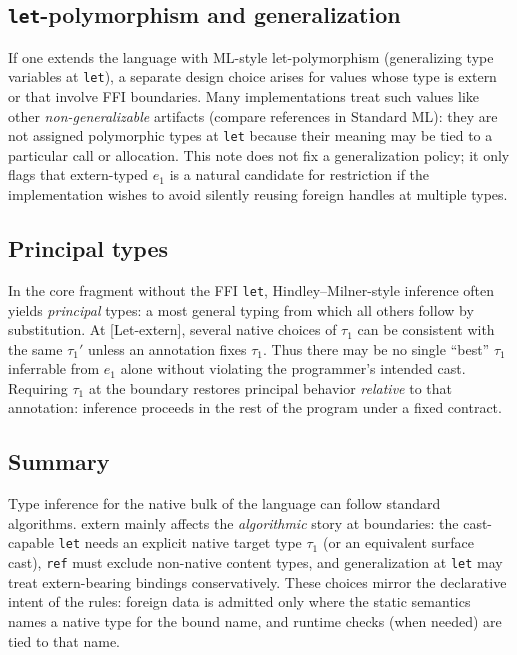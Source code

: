 \documentclass[11pt,a4paper]{article}
\begin{document}
\subsection{\texttt{let}-polymorphism and generalization}

If one extends the language with ML-style let-polymorphism (generalizing type variables at \texttt{let}), a separate design choice arises for values whose type is \textsf{extern} or that involve FFI boundaries.
Many implementations treat such values like other \emph{non-generalizable} artifacts (compare references in Standard ML): they are not assigned polymorphic types at \texttt{let} because their meaning may be tied to a particular call or allocation.
This note does not fix a generalization policy; it only flags that \textsf{extern}-typed $e_1$ is a natural candidate for restriction if the implementation wishes to avoid silently reusing foreign handles at multiple types.

\subsection{Principal types}

In the core fragment without the FFI \texttt{let}, Hindley--Milner-style inference often yields \emph{principal} types: a most general typing from which all others follow by substitution.
At \textsf{[{Let-extern}]}, several native choices of $\tau_1$ can be consistent with the same $\tau_1'$ unless an annotation fixes $\tau_1$.
Thus there may be no single ``best'' $\tau_1$ inferrable from $e_1$ alone without violating the programmer's intended cast.
Requiring $\tau_1$ at the boundary restores principal behavior \emph{relative} to that annotation: inference proceeds in the rest of the program under a fixed contract.

\subsection{Summary}

Type inference for the native bulk of the language can follow standard algorithms.
\textsf{extern} mainly affects the \emph{algorithmic} story at boundaries: the cast-capable \texttt{let} needs an explicit native target type $\tau_1$ (or an equivalent surface cast), \texttt{ref} must exclude non-native content types, and generalization at \texttt{let} may treat \textsf{extern}-bearing bindings conservatively.
These choices mirror the declarative intent of the rules: foreign data is admitted only where the static semantics names a native type for the bound name, and runtime checks (when needed) are tied to that name.
\end{document}
